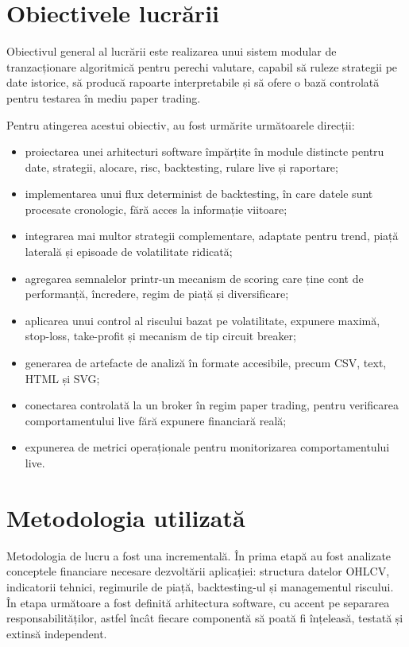 \section{Obiectivele lucrării}
\label{cap:cap1:obiective}

Obiectivul general al lucrării este realizarea unui sistem modular de tranzacționare algoritmică pentru perechi valutare, capabil să ruleze strategii pe date istorice, să producă rapoarte interpretabile și să ofere o bază controlată pentru testarea în mediu paper trading.

Pentru atingerea acestui obiectiv, au fost urmărite următoarele direcții:
\begin{itemize}
    \item proiectarea unei arhitecturi software împărțite în module distincte pentru date, strategii, alocare, risc, backtesting, rulare live și raportare;
    \item implementarea unui flux determinist de backtesting, în care datele sunt procesate cronologic, fără acces la informație viitoare;
    \item integrarea mai multor strategii complementare, adaptate pentru trend, piață laterală și episoade de volatilitate ridicată;
    \item agregarea semnalelor printr-un mecanism de scoring care ține cont de performanță, încredere, regim de piață și diversificare;
    \item aplicarea unui control al riscului bazat pe volatilitate, expunere maximă, stop-loss, take-profit și mecanism de tip circuit breaker;
    \item generarea de artefacte de analiză în formate accesibile, precum CSV, text, HTML și SVG;
    \item conectarea controlată la un broker în regim paper trading, pentru verificarea comportamentului live fără expunere financiară reală;
    \item expunerea de metrici operaționale pentru monitorizarea comportamentului live.
\end{itemize}

\section{Metodologia utilizată}
\label{cap:cap1:metodologie}

Metodologia de lucru a fost una incrementală. În prima etapă au fost analizate conceptele financiare necesare dezvoltării aplicației: structura datelor OHLCV, indicatorii tehnici, regimurile de piață, backtesting-ul și managementul riscului. În etapa următoare a fost definită arhitectura software, cu accent pe separarea responsabilităților, astfel încât fiecare componentă să poată fi înțeleasă, testată și extinsă independent.

